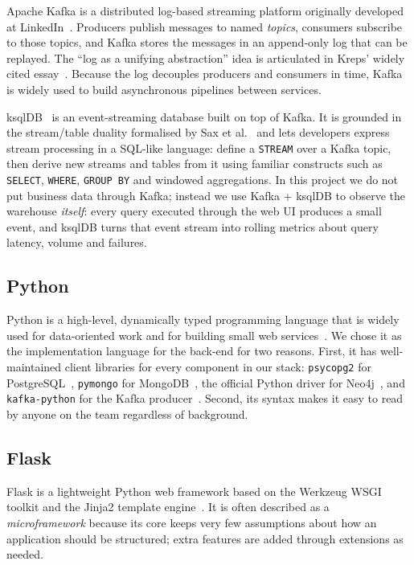\documentclass[11pt,a4paper]{article}
\begin{document}
Apache Kafka is a distributed log-based streaming platform originally
developed at LinkedIn~\cite{kreps2011kafka,kafka_docs}. Producers publish
messages to named \emph{topics}, consumers subscribe to those topics, and
Kafka stores the messages in an append-only log that can be replayed. The
``log as a unifying abstraction'' idea is articulated in Kreps' widely
cited essay~\cite{kreps2013log}. Because the log decouples producers and
consumers in time, Kafka is widely used to build asynchronous pipelines
between services.

ksqlDB~\cite{ksqldb_docs} is an event-streaming database built on top of
Kafka. It is grounded in the stream/table duality formalised by Sax et
al.~\cite{sax2018streams,confluent_streams_tables} and lets developers
express stream processing in a SQL-like language: define a \texttt{STREAM}
over a Kafka topic, then derive new streams and tables from it using
familiar constructs such as \texttt{SELECT}, \texttt{WHERE}, \texttt{GROUP
BY} and windowed aggregations. In this project we do not put business
data through Kafka; instead we use Kafka + ksqlDB to observe the
warehouse \emph{itself}: every query executed through the web UI produces
a small event, and ksqlDB turns that event stream into rolling metrics
about query latency, volume and failures.

\subsection{Python}

Python is a high-level, dynamically typed programming language that is
widely used for data-oriented work and for building small web
services~\cite{python_docs}. We chose it as the implementation language
for the back-end for two reasons. First, it has well-maintained client
libraries for every component in our stack: \texttt{psycopg2} for
PostgreSQL~\cite{psycopg_docs}, \texttt{pymongo} for
MongoDB~\cite{pymongo_docs}, the official Python driver for
Neo4j~\cite{neo4j_python_docs}, and \texttt{kafka-python} for the Kafka
producer~\cite{kafka_python_docs}. Second, its syntax makes it easy to
read by anyone on the team regardless of background.

\subsection{Flask}

Flask is a lightweight Python web framework based on the Werkzeug WSGI
toolkit and the Jinja2 template engine~\cite{flask_docs}. It is often
described as a \emph{microframework} because its core keeps very few
assumptions about how an application should be structured; extra features
are added through extensions as needed.
\end{document}
